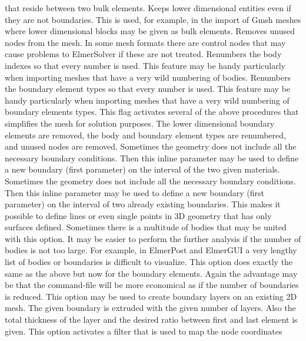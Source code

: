 that reside between two bulk elements.
%
Keeps lower dimensional entities even if they are not boundaries.
This is used, for example, in the import of Gmsh meshes where
lower dimensional blocks may be given as bulk elements.
%
Removes unused nodes from the mesh. In some mesh formats there are control nodes 
that may cause problems to ElmerSolver if these are not treated.
%
Renumbers the body indexes so that every number is used. This feature may be handy 
particularly when importing meshes that have a very wild numbering of bodies.
%
Renumbers the boundary element types so that every number is used. This feature may be handy 
particularly when importing meshes that have a very wild numbering of boundary elements types.
%
This flag activates several of the above procedures that simplifies the mesh
for solution purposes. The lower dimensional boundary elements are removed, 
the body and boundary element types are renumbered, and unused nodes are removed.
%
Sometimes the geometry does not include all the necessary boundary conditions. 
Then this inline parameter may be used to define a new boundary 
(first parameter) on the interval of the two given materials.
%
Sometimes the geometry does not include all the necessary boundary conditions. 
Then this inline parameter may be used to define a new boundary 
(first parameter) on the interval of two already existing boundaries.
This makes it possible to define lines or even single points 
in 3D geometry that has only surfaces defined.
%
Sometimes there is a multitude of bodies that may be united with this option.
It may be easier to perform the further analysis if the number of bodies 
is not too large.
For example, in ElmerPost and ElmerGUI a very lengthy list of bodies or 
boundaries is difficult to visualize. 
%
This option does exactly the same as the above but now for the boundary
 elements.
Again the advantage may be that the command-file will be more economical as 
if the number of boundaries is reduced.
%
This option may be used to create boundary layers on an existing 2D mesh.
The given boundary is extruded with the given number of layers. Also the total
thickness of the layer and the desired ratio between first and last element
is given.
%
This option activates a filter that is used to map the node coordinates 
